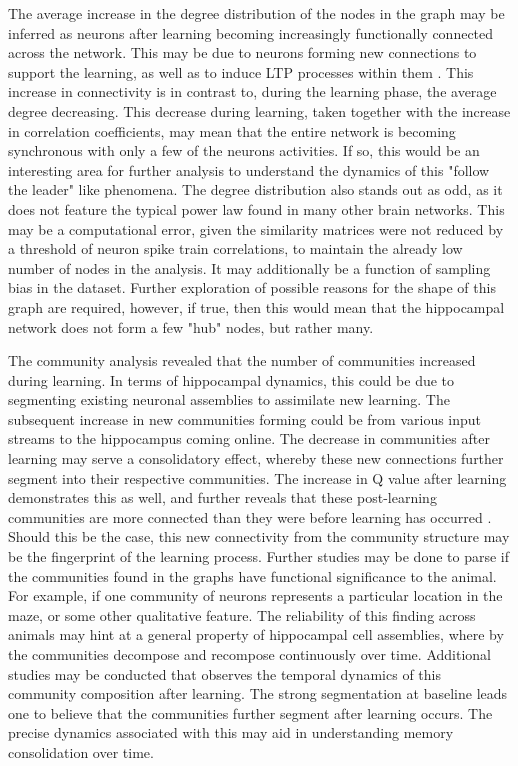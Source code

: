 \documentclass[9pt,twocolumn,twoside,lineno]{pnas-new}
\begin{document}
The average increase in the degree distribution of the nodes in the graph may be inferred as neurons after learning becoming increasingly functionally connected across the network. This may be due to neurons forming new connections to support the learning, as well as to induce LTP processes within them \cite{pastalkova2008internally}. This increase in connectivity is in contrast to, during the learning phase, the average degree decreasing. This decrease during learning, taken together with the increase in correlation coefficients, may mean that the entire network is becoming synchronous with only a few of the neurons activities. If so, this would be an interesting area for further analysis to understand the dynamics of this "follow the leader" like phenomena. The degree distribution also stands out as odd, as it does not feature the typical power law found in many other brain networks. This may be a computational error, given the similarity matrices were not reduced by a threshold of neuron spike train correlations, to maintain the already low number of nodes in the analysis. It may additionally be a function of sampling bias in the dataset. Further exploration of possible reasons for the shape of this graph are required, however, if true, then this would mean that the hippocampal network does not form a few "hub" nodes, but rather many.

The community analysis revealed that the number of communities increased during learning. In terms of hippocampal dynamics, this could be due to segmenting existing neuronal assemblies to assimilate new learning. The subsequent increase in new communities forming could be from various input streams to the hippocampus coming online. The decrease in communities after learning may serve a consolidatory effect, whereby these new connections further segment into their respective communities. The increase in Q value after learning demonstrates this as well, and further reveals that these post-learning communities are more connected than they were before learning has occurred \cite{blondel2008fast}. Should this be the case, this new connectivity from the community structure may be the fingerprint of the learning process. Further studies may be done to parse if the communities found in the graphs have functional significance to the animal. For example, if one community of neurons represents a particular location in the maze, or some other qualitative feature. The reliability of this finding across animals may hint at a general property of hippocampal cell assemblies, where by the communities decompose and recompose continuously over time. Additional studies may be conducted that observes the temporal dynamics of this community composition after learning. The strong segmentation at baseline leads one to believe that the communities further segment after learning occurs. The precise dynamics associated with this may aid in understanding memory consolidation over time.
\end{document}
